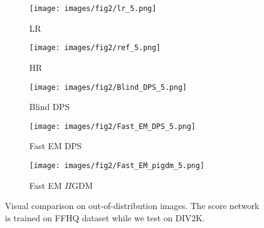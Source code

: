 \documentclass[10pt,twocolumn,letterpaper]{article}
\begin{document}
%
\begin{figure}
     \centering
     \begin{subfigure}{0.3\columnwidth}
             \centering
             \texttt{[image: images/fig2/lr\_5.png]}
             \caption{LR}
             \label{fig2:coolcat}
     \end{subfigure}
     \begin{subfigure}{0.3\columnwidth}
             \centering
             \texttt{[image: images/fig2/ref\_5.png]}
             \caption{HR}
             \label{fig2:tired}
      \end{subfigure}
      
      \begin{subfigure}{0.3\columnwidth}
             \centering
             \texttt{[image: images/fig2/Blind\_DPS\_5.png]}
             \caption{Blind DPS}
             \label{fig2:bossycat}
      \end{subfigure}
      \begin{subfigure}{0.3\columnwidth}
             \centering
             \texttt{[image: images/fig2/Fast\_EM\_DPS\_5.png]}
             \caption{Fast EM DPS}
             \label{fig2:frowningcat}
      \end{subfigure}
      \begin{subfigure}{0.3\columnwidth}
         \centering
         \texttt{[image: images/fig2/Fast\_EM\_pigdm\_5.png]}
         \caption{Fast EM $\Pi$GDM}
         \label{fig2:scared}
     \end{subfigure}
\caption{Visual comparison on out-of-distribution images. The score network is trained on FFHQ dataset while we test on DIV2K.}
\vspace{-10pt}
\label{fig:visual_res_2}
\end{figure}
\end{document}
